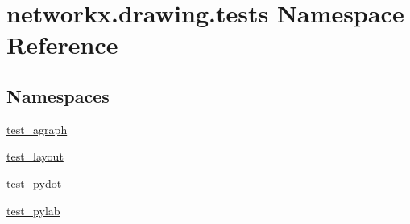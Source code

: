 \hypertarget{namespacenetworkx_1_1drawing_1_1tests}{}\section{networkx.\+drawing.\+tests Namespace Reference}
\label{namespacenetworkx_1_1drawing_1_1tests}
\subsection*{Namespaces}
\begin{DoxyCompactItemize}
\item 
 \hyperlink{namespacenetworkx_1_1drawing_1_1tests_1_1test__agraph}{test\+\_\+agraph}
\item 
 \hyperlink{namespacenetworkx_1_1drawing_1_1tests_1_1test__layout}{test\+\_\+layout}
\item 
 \hyperlink{namespacenetworkx_1_1drawing_1_1tests_1_1test__pydot}{test\+\_\+pydot}
\item 
 \hyperlink{namespacenetworkx_1_1drawing_1_1tests_1_1test__pylab}{test\+\_\+pylab}
\end{DoxyCompactItemize}
